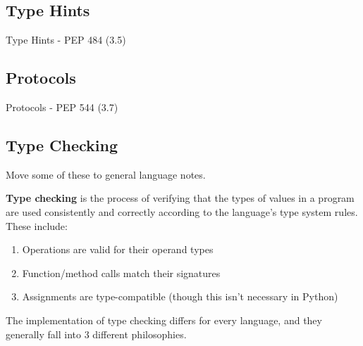 \subsection{Type Hints}

  Type Hints - PEP 484 (3.5) 

\subsection{Protocols}

  Protocols - PEP 544 (3.7) 

\subsection{Type Checking}

  \begin{question}[To Do]
    Move some of these to general language notes. 
  \end{question}

  \begin{definition}
    \textbf{Type checking} is the process of verifying that the types of values in a program are used consistently and correctly according to the language's type system rules. These include: 
    \begin{enumerate}
      \item Operations are valid for their operand types 
      \item Function/method calls match their signatures 
      \item Assignments are type-compatible (though this isn't necessary in Python) 
    \end{enumerate}
  \end{definition}

  The implementation of type checking differs for every language, and they generally fall into 3 different philosophies. 

